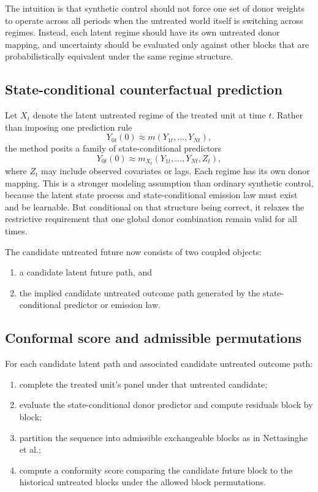 \documentclass[11pt]{article}
\begin{document}
The intuition is that synthetic control should not force one set of donor weights to operate across all periods when the untreated world itself is switching across regimes. Instead, each latent regime should have its own untreated donor mapping, and uncertainty should be evaluated only against other blocks that are probabilistically equivalent under the same regime structure.

\subsection{State-conditional counterfactual prediction}

Let $X_t$ denote the latent untreated regime of the treated unit at time $t$. Rather than imposing one prediction rule
\[
Y_{0t}(0) \approx m(Y_{1t},\dots,Y_{Nt}),
\]
the method posits a family of state-conditional predictors
\[
Y_{0t}(0) \approx m_{X_t}(Y_{1t},\dots,Y_{Nt},Z_t),
\]
where $Z_t$ may include observed covariates or lags. Each regime has its own donor mapping. This is a stronger modeling assumption than ordinary synthetic control, because the latent state process and state-conditional emission law must exist and be learnable. But conditional on that structure being correct, it relaxes the restrictive requirement that one global donor combination remain valid for all times.

The candidate untreated future now consists of two coupled objects:

\begin{enumerate}[label=(\alph*)]
    \item a candidate latent future path, and
    \item the implied candidate untreated outcome path generated by the state-conditional predictor or emission law.
\end{enumerate}

\subsection{Conformal score and admissible permutations}

For each candidate latent path and associated candidate untreated outcome path:

\begin{enumerate}[label=\arabic*.]
    \item complete the treated unit's panel under that untreated candidate;
    \item evaluate the state-conditional donor predictor and compute residuals block by block;
    \item partition the sequence into admissible exchangeable blocks as in Nettasinghe et al.;
    \item compute a conformity score comparing the candidate future block to the historical untreated blocks under the allowed block permutations.
\end{enumerate}
\end{document}
